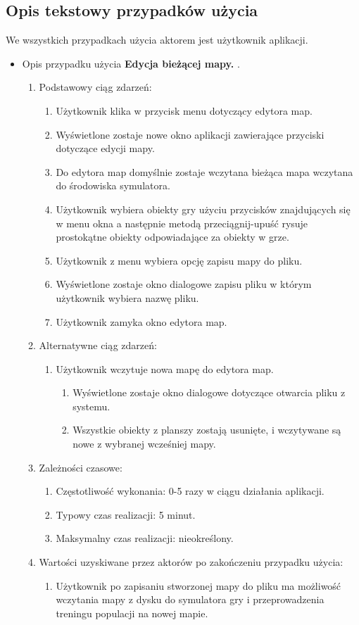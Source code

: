 \subsection{Opis tekstowy przypadków użycia}
\begin{par}
	We wszystkich przypadkach użycia aktorem jest użytkownik aplikacji.
	\begin{itemize}

	\item
	Opis przypadku użycia {\bf Edycja bieżącej mapy. }.
	\begin{enumerate}
	\item Podstawowy ciąg zdarzeń:
		\begin{enumerate}
		\item Użytkownik klika w przycisk menu dotyczący edytora map.
		\item Wyświetlone zostaje nowe okno aplikacji zawierające przyciski dotyczące edycji mapy.
		\item Do edytora map domyślnie zostaje wczytana bieżąca mapa wczytana do środowiska symulatora.
		\item Użytkownik wybiera obiekty gry użyciu przycisków znajdujących się w menu okna a następnie metodą przeciągnij-upuść rysuje prostokątne obiekty odpowiadające za obiekty w grze.
		\item Użytkownik z menu wybiera opcję zapisu mapy do pliku.
		\item Wyświetlone zostaje okno dialogowe zapisu pliku w którym użytkownik wybiera nazwę pliku.
		\item Użytkownik zamyka okno edytora map.
		\end{enumerate}
	\item Alternatywne ciąg zdarzeń:
		\begin{enumerate}
		\item Użytkownik wczytuje nowa mapę do edytora map. 
			\begin{enumerate}
			\item Wyświetlone zostaje okno dialogowe dotyczące otwarcia pliku z systemu.
			\item Wszystkie obiekty z planszy zostają usunięte, i wczytywane są nowe z wybranej wcześniej mapy.
			\end{enumerate}
		\end{enumerate}
	\item Zależności czasowe:
		\begin{enumerate}
		\item Częstotliwość wykonania: 0-5 razy w ciągu działania aplikacji.
		\item Typowy czas realizacji: 5 minut.
		\item Maksymalny czas realizacji: nieokreślony.
		\end{enumerate}
	\item Wartości uzyskiwane przez aktorów po zakończeniu przypadku użycia:
		\begin{enumerate}
		\item Użytkownik po zapisaniu stworzonej mapy do pliku ma możliwość wczytania mapy z dysku do symulatora gry i przeprowadzenia treningu populacji na nowej mapie.
		\end{enumerate}
	\end{enumerate}


\end{itemize}
\end{par}
